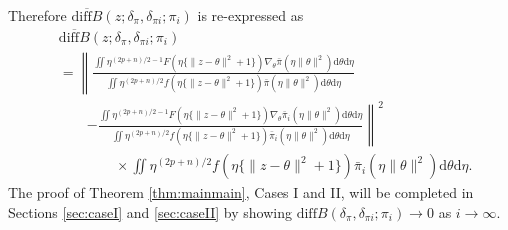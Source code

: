 \documentclass[preprint,11pt]{imsart}
\numberwithin{equation}{section}
\theoremstyle{plain}
\theoremstyle{definition}
\theoremstyle{remark}
\newcommand{\rd}{\mathrm{d}}
\newcommand{\oldiff}{\overline{\mathrm{diff}B}}
\newcommand{\ndiff}{\mathrm{diff}B}
\begin{document}
Therefore $\oldiff(z;\delta_\pi,\delta_{\pi i};\pi_i)$ is re-expressed as
\begin{equation}\label{diff.general}
\begin{split}
& \oldiff(z;\delta_\pi,\delta_{\pi i};\pi_i) \\
&=\left\|\frac{\iint 
  \eta^{(2p+n)/2-1} F(\eta\{\|z-\theta\|^2+1\}) 
 \nabla_\theta\bar{\pi}(\eta\|\theta\|^2) \rd \theta   \rd \eta}
 {\iint 
  \eta^{(2p+n)/2} f(\eta\{\|z-\theta\|^2+1\}) 
\bar{\pi}(\eta\|\theta\|^2) \rd \theta   \rd \eta}\right. \\
 &\qquad \left.
- \frac{\iint 
  \eta^{(2p+n)/2-1} F(\eta\{\|z-\theta\|^2+1\}) 
 \nabla_\theta\bar{\pi}_i(\eta\|\theta\|^2) \rd \theta   \rd \eta}
 {\iint 
  \eta^{(2p+n)/2} f(\eta\{\|z-\theta\|^2+1\}) 
\bar{\pi}_{i}(\eta\|\theta\|^2) \rd \theta   \rd \eta}\right\|^2 \\
 &\qquad\qquad\times \iint\eta^{(2p+n)/2} f(\eta\{\|z-\theta\|^2+1\}) 
\bar{\pi}_{i}(\eta\|\theta\|^2) \rd \theta   \rd \eta.
\end{split}
\end{equation}
The proof of Theorem \ref{thm:mainmain}, Cases I and II, will be completed in Sections
\ref{sec:caseI} and \ref{sec:caseII}
by showing $\ndiff(\delta_\pi,\delta_{\pi i};\pi_i) \to 0$ as $i\to\infty$.
\end{document}
